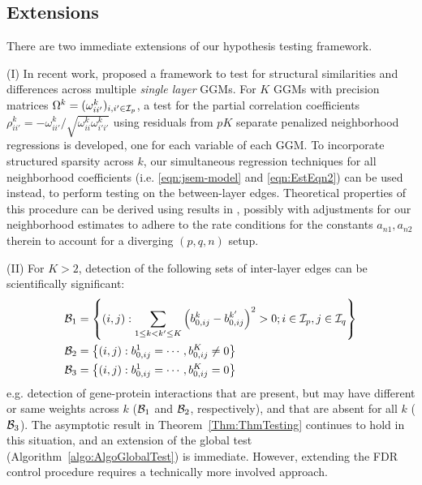 \subsection{Extensions}
There are two immediate extensions of our hypothesis testing framework.

\vspace{1em}
\noindent (I) In recent work, \citet{Liu17} proposed a framework to test for structural similarities and differences across multiple {\it single layer} GGMs. For $K$ GGMs with precision matrices $\Omega^k = (\omega_{ii'}^k)_{i,i' \in {\cal{I}}_p}$, a test for the partial correlation coefficients $\rho_{ii'}^{k} = - \omega_{ii'}^{k} / \sqrt{\omega_{ii}^{k} \omega_{i'i'}^{k}}$ using residuals from $pK$ separate penalized neighborhood regressions is developed, one for each variable of each GGM. To incorporate structured sparsity across $k$, our simultaneous regression techniques for all neighborhood coefficients (i.e. \eqref{eqn:jsem-model} and \eqref{eqn:EstEqn2}) can be used instead, to perform testing on the between-layer edges. Theoretical properties of this procedure can be derived using results in \citet{Liu17}, possibly with adjustments for our neighborhood estimates to adhere to the rate conditions for the constants $a_{n1}, a_{n2}$ therein to account for a diverging $(p,q,n)$ setup.

\noindent (II) For $K > 2$, detection of the following sets of inter-layer edges can be scientifically significant:
%
\begin{align*}
{\cal{B}}_1 &= \left\{ (i,j): \sum_{1 \leq k < k' \leq K} \left(b_{0,ij}^k - b_{0,ij}^{k'} \right)^2 > 0; i \in {\cal{I}}_p, j \in {\cal{I}}_q \right\}\\
{\cal{B}}_2 &= \left\{ (i,j): b_{0,ij}^1 = \cdots, b_{0,ij}^K \neq 0 \right\}\\
{\cal{B}}_3 &= \left\{ (i,j): b_{0,ij}^1 = \cdots, b_{0,ij}^K = 0 \right\}
\end{align*}
%
e.g. detection of gene-protein interactions that are present, but may have different or same weights across $k$ (${\cal{B}}_1$ and ${\cal{B}}_2$, respectively), and that are absent for all $k$ (${\cal{B}}_3$). The asymptotic result in Theorem~\ref{Thm:ThmTesting} continues to hold in this situation, and an extension of the global test (Algorithm~\ref{algo:AlgoGlobalTest}) is immediate. However, extending the FDR control procedure requires a technically more involved approach.

